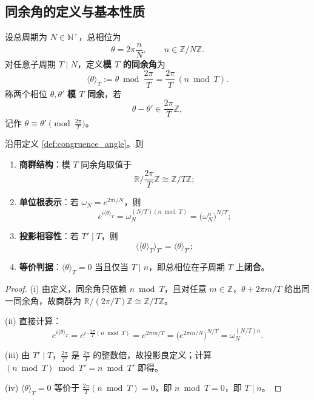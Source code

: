 \subsection{同余角的定义与基本性质}

\begin{definition}[同余角]\label{def:congruence_angle}
设总周期为 $N\in\mathbb{N}^+$，总相位为
\[
\theta=2\pi\frac{n}{N},\qquad n\in\mathbb{Z}/N\mathbb{Z}.
\]
对任意子周期 $T\mid N$，定义\textbf{模 $T$ 的同余角}为
\[
\langle\theta\rangle_T:=\theta\bmod\frac{2\pi}{T}
=\frac{2\pi}{T}\,(n\bmod T).
\]
称两个相位 $\theta,\theta'$ \textbf{模 $T$ 同余}，若
\[
\theta-\theta'\in\frac{2\pi}{T}\mathbb{Z},
\]
记作 $\theta\equiv\theta'\pmod{\frac{2\pi}{T}}$。
\end{definition}

\begin{proposition}[同余角的基本性质]\label{prop:congruence_angle_properties}
沿用定义 \ref{def:congruence_angle}。则
\begin{enumerate}[label=(\roman*)]
    \item \textbf{商群结构}：模 $T$ 同余角取值于
    \[
    \mathbb{R}\Big/\frac{2\pi}{T}\mathbb{Z}\cong\mathbb{Z}/T\mathbb{Z};
    \]
    \item \textbf{单位根表示}：若 $\omega_N=e^{2\pi i/N}$，则
    \[
    e^{i\langle\theta\rangle_T}
    =\omega_N^{(N/T)(n\bmod T)}
    =\big(\omega_N^n\big)^{N/T};
    \]
    \item \textbf{投影相容性}：若 $T'\mid T$，则
    \[
    \big\langle\langle\theta\rangle_T\big\rangle_{T'}
    =\langle\theta\rangle_{T'};
    \]
    \item \textbf{等价判据}：$\langle\theta\rangle_T=0$ 当且仅当 $T\mid n$，即总相位在子周期 $T$ 上\textbf{闭合}。
\end{enumerate}
\end{proposition}

\begin{proof}
(i) 由定义，同余角只依赖 $n\bmod T$，且对任意 $m\in\mathbb{Z}$，$\theta+2\pi m/T$ 给出同一同余角，故商群为 $\mathbb{R}/(2\pi/T)\mathbb{Z}\cong\mathbb{Z}/T\mathbb{Z}$。

(ii) 直接计算：
\[
e^{i\langle\theta\rangle_T}
=e^{i\cdot\frac{2\pi}{T}(n\bmod T)}
=e^{2\pi i n/T}
=\big(e^{2\pi i n/N}\big)^{N/T}
=\omega_N^{(N/T)n}.
\]

(iii) 由 $T'\mid T$，$\frac{2\pi}{T'}$ 是 $\frac{2\pi}{T}$ 的整数倍，故投影良定义；计算 $(n\bmod T)\bmod T'=n\bmod T'$ 即得。

(iv) $\langle\theta\rangle_T=0$ 等价于 $\frac{2\pi}{T}(n\bmod T)=0$，即 $n\bmod T=0$，即 $T\mid n$。
\end{proof}

